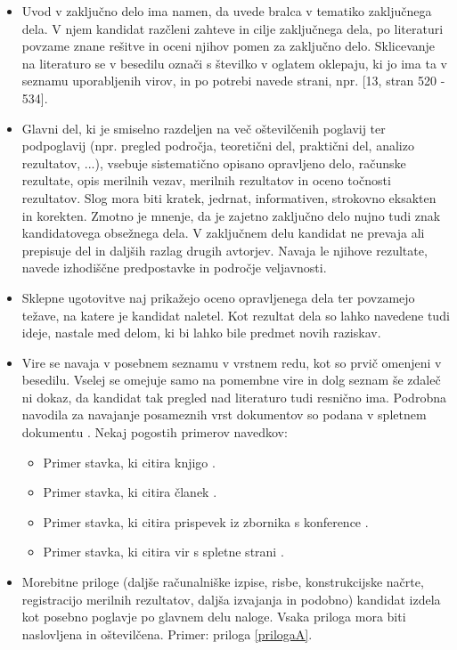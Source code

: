 \documentclass[a4paper,twoside,openright,12pt,slovene]{book}
\begin{document}
\begin{itemize}

\item Uvod v zaključno delo ima namen, da uvede bralca v tematiko zaključnega dela. V njem kandidat razčleni zahteve in cilje zaključnega dela, po literaturi povzame znane rešitve in oceni njihov pomen za zaključno delo. Sklicevanje na literaturo se v besedilu označi s številko v oglatem oklepaju, ki jo ima ta v seznamu uporabljenih virov, in po potrebi navede strani, npr. [13, stran 520 - 534].

\item Glavni del, ki je smiselno razdeljen na več oštevilčenih poglavij ter podpoglavij (npr. pregled področja, teoretični del, praktični del, analizo rezultatov, ...), vsebuje sistematično opisano opravljeno delo, računske rezultate, opis merilnih vezav, merilnih rezultatov in oceno točnosti rezultatov. Slog mora biti kratek, jedrnat, informativen, strokovno eksakten in korekten. Zmotno je mnenje, da je zajetno zaključno delo nujno tudi znak kandidatovega obsežnega dela. V zaključnem delu kandidat ne prevaja ali prepisuje del in daljših razlag drugih avtorjev. Navaja le njihove rezultate, navede izhodiščne predpostavke in področje veljavnosti.

\item Sklepne ugotovitve naj prikažejo oceno opravljenega dela ter povzamejo težave, na katere je kandidat naletel. Kot rezultat dela so lahko navedene tudi ideje, nastale med delom, ki bi lahko bile predmet novih raziskav.

\item Vire se navaja v posebnem seznamu v vrstnem redu, kot so prvič omenjeni v besedilu. Vselej se omejuje samo na pomembne vire in dolg seznam še zdaleč ni dokaz, da kandidat tak pregled nad literaturo tudi resnično ima. Podrobna navodila za navajanje posameznih vrst dokumentov so podana v spletnem dokumentu \cite{oven2013}. Nekaj pogostih primerov navedkov:
\begin{itemize}[noitemsep]
    \item Primer stavka, ki citira knjigo \cite{juznic1992diplomska}.
    \item Primer stavka, ki citira članek \cite{kuscer1996}.
    \item Primer stavka, ki citira prispevek iz zbornika s konference \cite{ambrozic2012}.
    \item Primer stavka, ki citira vir s spletne strani \cite{bor2006}.
\end{itemize}

\item Morebitne priloge (daljše računalniške izpise, risbe, konstrukcijske načrte, registracijo merilnih rezultatov, daljša izvajanja in podobno) kandidat izdela kot posebno poglavje po glavnem delu naloge. Vsaka priloga mora biti naslovljena in oštevilčena. Primer: priloga \ref{prilogaA}.

\end{itemize}
\end{document}
